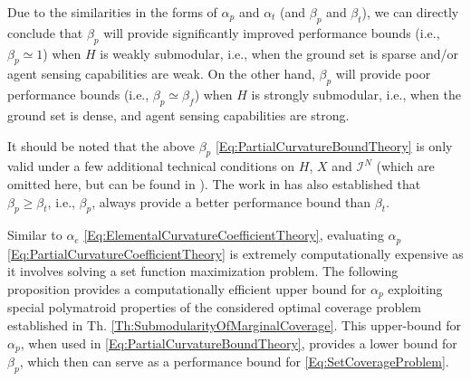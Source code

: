 \documentclass[letterpaper, 10 pt, conference]{ieeeconf}
\begin{document}
Due to the similarities in the forms of $\alpha_p$ and $\alpha_t$ (and $\beta_p$ and $\beta_t$), we can directly conclude that $\beta_p$ will provide significantly improved performance bounds (i.e., $\beta_p \simeq 1$) when $H$ is weakly submodular, i.e., when the ground set is sparse and/or agent sensing capabilities are weak. On the other hand, $\beta_p$ will provide poor performance bounds (i.e., $\beta_p \simeq \beta_f$) when $H$ is strongly submodular, i.e., when the ground set is dense, and agent sensing capabilities are strong.  


It should be noted that the above $\beta_p$ \eqref{Eq:PartialCurvatureBoundTheory} is only valid under a few additional technical conditions on $H$, $X$ and $\mathcal{I}^N$ (which are omitted here, but can be found in \cite{Liu2018}). 
The work in \cite{Liu2018} has also established that $\beta_p \geq \beta_t$, i.e., $\beta_p$, always provide a better performance bound than $\beta_t$. 


Similar to $\alpha_e$ \eqref{Eq:ElementalCurvatureCoefficientTheory}, evaluating $\alpha_p$ \eqref{Eq:PartialCurvatureCoefficientTheory} is extremely computationally expensive as it involves solving a set function maximization problem. The following proposition provides a computationally efficient upper bound for $\alpha_p$ exploiting special polymatroid properties of the considered optimal coverage problem established in Th. \ref{Th:SubmodularityOfMarginalCoverage}. This upper-bound for $\alpha_p$, when used in \eqref{Eq:PartialCurvatureBoundTheory}, provides a lower bound for $\beta_p$, which then can serve as a performance bound for \eqref{Eq:SetCoverageProblem}.
\end{document}

